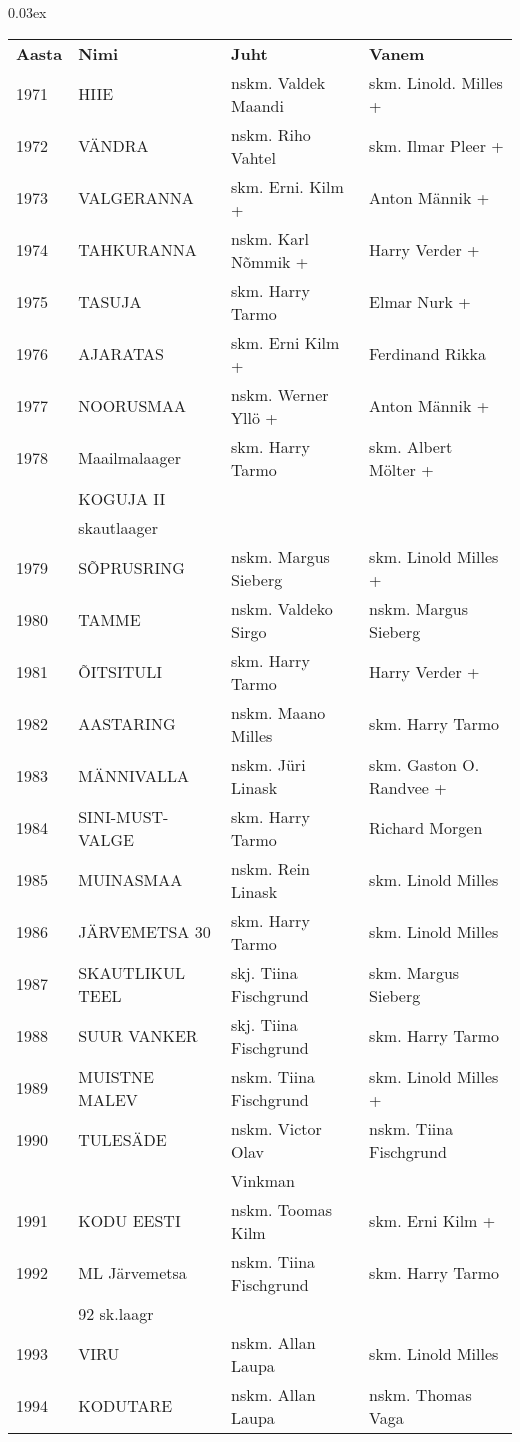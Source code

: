 \documentclass[10pt]{book}
\begin{document}
{\centering\scriptsize\arrayrulewidth 0.03ex
\begin{tabular*}{1.0\textwidth}{@{\extracolsep{\fill}}@{}l@{}@{}l@{}@{}l@{}@{}l@{}}
\bf{Aasta}	&	\bf{Nimi}				&	\bf{Juht}				&	\bf{Vanem}\\[2mm]
	1971	&	HIIE					&	nskm. Valdek Maandi		&	skm. Linold. Milles +\\[2mm]
	1972	&	V\"ANDRA				&	nskm. Riho Vahtel		&	skm. Ilmar Pleer +\\[2mm]
	1973	&	VALGERANNA				&	skm. Erni. Kilm +		&	Anton M\"annik +\\[2mm]
	1974	&	TAHKURANNA				&	nskm. Karl N\~ommik +	&	Harry Verder +\\[2mm]
	1975	&	TASUJA					&	skm. Harry Tarmo		&	Elmar Nurk +\\[2mm]
	1976	&	AJARATAS				&	skm. Erni Kilm +		&	Ferdinand Rikka\\[2mm]
	1977	&	NOORUSMAA				&	nskm. Werner Yll\"o +	&	Anton M\"annik +\\[2mm]
	1978	&	Maailmalaager 			&	skm. Harry Tarmo		&	skm. Albert M\"olter +\\
			&	KOGUJA II 				&							&	\\
			&	skautlaager				&							&	\\[2mm]
	1979	&	S\~OPRUSRING			&	nskm. Margus Sieberg	&	skm. Linold Milles +\\[2mm]
	1980	&	TAMME					&	nskm. Valdeko Sirgo		&	nskm. Margus Sieberg\\[2mm]
	1981	&	\~OITSITULI				&	skm. Harry Tarmo		&	Harry Verder +\\[2mm]
	1982	&	AASTARING				&	nskm. Maano Milles		&	skm. Harry Tarmo\\[2mm]
	1983	&	M\"ANNIVALLA			&	nskm. J\"uri Linask		&	skm. Gaston O. Randvee +\\[2mm]
	1984	&	SINI-MUST-VALGE			&	skm. Harry Tarmo		&	Richard Morgen\\[2mm]
	1985	&	MUINASMAA				&	nskm. Rein Linask		&	skm. Linold Milles\\[2mm]
	1986	&	J\"ARVEMETSA 30			&	skm. Harry Tarmo		&	skm. Linold Milles\\[2mm]
	1987	&	SKAUTLIKUL TEEL			&	skj. Tiina Fischgrund	&	skm. Margus Sieberg\\[2mm]
	1988	&	SUUR VANKER				&	skj. Tiina Fischgrund	&	skm. Harry Tarmo\\[2mm]
	1989	&	MUISTNE MALEV			&	nskm. Tiina Fischgrund	&	skm. Linold Milles +\\[2mm]
	1990	&	TULES\"ADE				&	nskm. Victor Olav 		&	nskm.   Tiina Fischgrund\\
			&							&	Vinkman					&	\\[2mm]
	1991	&	KODU EESTI				&	nskm. Toomas Kilm		&	skm. Erni Kilm +\\[2mm]
	1992	&	ML J\"arvemetsa  		&	nskm. Tiina Fischgrund	&	skm. Harry Tarmo\\
			&	92 sk.laagr				&							&	\\[2mm]
	1993	&	VIRU					&	nskm. Allan Laupa		&	skm. Linold Milles\\[2mm]
	1994	&	KODUTARE				&	nskm. Allan Laupa		&	nskm. Thomas Vaga\\[2mm]
\end{tabular*}}
\end{document}

